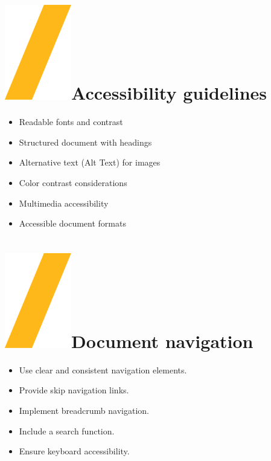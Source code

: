 \documentclass[a0paper,fleqn]{src/betterposter}
\begin{document}
{\section{\includegraphics[height=\fontcharht\font`\S]{img/general/slash.png}Accessibility guidelines}

\begin{itemize}
\item Readable fonts and contrast
\item Structured document with headings
\item Alternative text (Alt Text) for images
\item Color contrast considerations
\item Multimedia accessibility
\item Accessible document formats
\end{itemize}

\section{\includegraphics[height=\fontcharht\font`\S]{img/general/slash.png}Document navigation}

\begin{itemize}
\item Use clear and consistent navigation elements.
\item Provide skip navigation links.
\item Implement breadcrumb navigation.
\item Include a search function.
\item Ensure keyboard accessibility.
\end{itemize}



}
\end{document}
